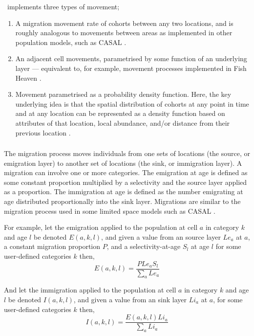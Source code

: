 \SPM\ implements three types of movement;
\begin{enumerate}
	\item  A migration movement rate of cohorts between any two locations, and is roughly analogous to movements between areas as implemented in other population models, such as CASAL \citep{1388}.
	\item An adjacent cell movements, parametrised by some function of an underlying layer --- equivalent to, for example, movement processes implemented in Fish Heaven \citep{1136,1135}. 
	\item Movement parametrised as a probability density function. Here, the key underlying idea is that the spatial distribution of cohorts at any point in time and at any location can be represented as a density function based on attributes of that location, local abundance, and/or distance from their previous location \citep{1366,1367}. 
\end{enumerate}

\subsubsection{}

The migration process moves individuals from one sets of locations (the source, or emigration layer) to another set of locations (the sink, or immigration layer). A migration can involve one or more categories. The emigration at age is defined as some constant proportion multiplied by a selectivity and the source layer applied as a proportion. The immigration at age is defined as the number emigrating at age distributed proportionally into the sink layer. Migrations are similar to the migration process used in some limited space models such as CASAL \citep{1388}.

For example, let the emigration applied to the population at cell $a$ in category $k$ and age $l$ be denoted $E(a,k,l)$, and given a value from an source layer $Le_a$  at $a$, a constant migration proportion $P$, and a selectivity-at-age $S_l$ at age $l$ for some user-defined categories $k$ then, 
\begin{equation}
  E(a,k,l) = \frac{P Le_a S_l }{\sum\limits_a Le_a}
\end{equation}

And let the immigration applied to the population at cell $a$ in category $k$ and age $l$ be denoted $I(a,k,l)$, and given a value from an sink layer $Li_a$  at $a$, for some user-defined categories $k$ then, 
\begin{equation}
  I(a,k,l) = \frac{E(a,k,l) Li_a }{\sum\limits_a Li_a} 
\end{equation}

